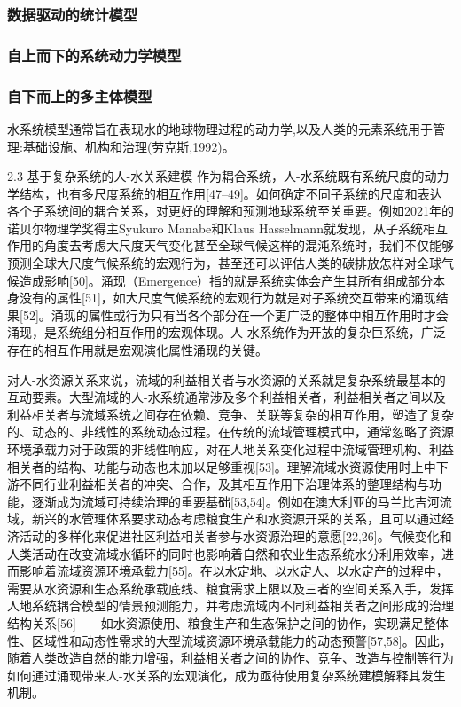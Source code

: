 
\subsubsection*{数据驱动的统计模型}


\subsubsection*{自上而下的系统动力学模型}


\subsubsection*{自下而上的多主体模型}
水系统模型通常旨在表现水的地球物理过程的动力学,以及人类的元素系统用于管理:基础设施、机构和治理(劳克斯,1992)。

2.3 基于复杂系统的人-水关系建模
作为耦合系统，人-水系统既有系统尺度的动力学结构，也有多尺度系统的相互作用[47–49]。如何确定不同子系统的尺度和表达各个子系统间的耦合关系，对更好的理解和预测地球系统至关重要。例如2021年的诺贝尔物理学奖得主Syukuro Manabe和Klaus Hasselmann就发现，从子系统相互作用的角度去考虑大尺度天气变化甚至全球气候这样的混沌系统时，我们不仅能够预测全球大尺度气候系统的宏观行为，甚至还可以评估人类的碳排放怎样对全球气候造成影响[50]。涌现（Emergence）指的就是系统实体会产生其所有组成部分本身没有的属性[51]，如大尺度气候系统的宏观行为就是对子系统交互带来的涌现结果[52]。涌现的属性或行为只有当各个部分在一个更广泛的整体中相互作用时才会涌现，是系统组分相互作用的宏观体现。人-水系统作为开放的复杂巨系统，广泛存在的相互作用就是宏观演化属性涌现的关键。

对人-水资源关系来说，流域的利益相关者与水资源的关系就是复杂系统最基本的互动要素。大型流域的人-水系统通常涉及多个利益相关者，利益相关者之间以及利益相关者与流域系统之间存在依赖、竞争、关联等复杂的相互作用，塑造了复杂的、动态的、非线性的系统动态过程。在传统的流域管理模式中，通常忽略了资源环境承载力对于政策的非线性响应，对在人地关系变化过程中流域管理机构、利益相关者的结构、功能与动态也未加以足够重视[53]。理解流域水资源使用时上中下游不同行业利益相关者的冲突、合作，及其相互作用下治理体系的整理结构与功能，逐渐成为流域可持续治理的重要基础[53,54]。例如在澳大利亚的马兰比吉河流域，新兴的水管理体系要求动态考虑粮食生产和水资源开采的关系，且可以通过经济活动的多样化来促进社区利益相关者参与水资源治理的意愿[22,26]。气候变化和人类活动在改变流域水循环的同时也影响着自然和农业生态系统水分利用效率，进而影响着流域资源环境承载力[55]。在以水定地、以水定人、以水定产的过程中，需要从水资源和生态系统承载底线、粮食需求上限以及三者的空间关系入手，发挥人地系统耦合模型的情景预测能力，并考虑流域内不同利益相关者之间形成的治理结构关系[56]——如水资源使用、粮食生产和生态保护之间的协作，实现满足整体性、区域性和动态性需求的大型流域资源环境承载能力的动态预警[57,58]。因此，随着人类改造自然的能力增强，利益相关者之间的协作、竞争、改造与控制等行为如何通过涌现带来人-水关系的宏观演化，成为亟待使用复杂系统建模解释其发生机制。

